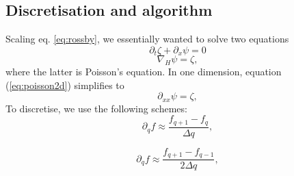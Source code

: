 \subsection{Discretisation and algorithm}
\label{sec:algo}
Scaling eq. \ref{eq:rossby}, we essentially wanted to solve two equations
	\begin{equation}
	\label{eq:betaplane}
		\partial_t \zeta + \partial_x \psi = 0
	\end{equation}
	\begin{equation}
		\label{eq:poisson2d}
		\nabla_H\psi = \zeta,
	\end{equation}
where the latter is Poisson's equation. In one dimension, equation (\ref{eq:poisson2d}) simplifies to
\begin{equation}
	\label{eq:poisson}
	\partial_{xx}\psi = \zeta,
\end{equation}
 To discretise, we use the following schemes:
	\begin{equation}
	\label{eq:explicit}
	\partial_q f \approx \frac{f_{q+1} - f_q}{\Delta q},
	\end{equation}

	\begin{equation}
	\label{eq:implicit}
		\partial_q f \approx \frac{f_{q+1} - f_{q-1}}{2\Delta q},
	\end{equation}
	
